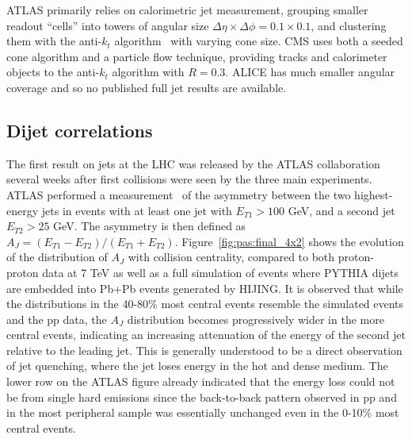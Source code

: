 ATLAS primarily relies on calorimetric jet measurement, grouping smaller readout ``cells''      
into towers of angular size $\Delta \eta \times \Delta \phi = 0.1 \times 0.1$, and 
clustering them with the anti-$k_t$ algorithm~\cite{Cacciari:2008gp} with varying cone size.
CMS uses both a seeded cone algorithm and a 
particle flow technique, providing tracks and calorimeter objects to the 
anti-$k_t$ algorithm with $R=0.3$.
ALICE has much smaller angular coverage and so no published full jet results are available.

\subsection{Dijet correlations}

The first result on jets at the LHC was released by the ATLAS collaboration 
several weeks after first collisions were seen by the three main experiments.  
ATLAS performed a measurement~\cite{Aad:2010bu} of
the asymmetry between the two highest-energy jets in events with at least one jet
with $E_{T1} > 100$ GeV, and a second jet $E_{T2} > 25$ GeV.  The asymmetry is
then defined as $A_J = (E_{T1} - E_{T2})/(E_{T1} + E_{T2})$.
Figure~\ref{fig:pas:final_4x2} shows the evolution of the distribution of
$A_J$ with collision centrality, compared to both proton-proton data at 7 TeV
as well as a full simulation of events where PYTHIA dijets are embedded into
Pb+Pb events generated by HIJING.
It is observed that while the distributions in the 40-80\% most central events
resemble the simulated events and the pp data, the $A_J$ distribution becomes
progressively wider in the more central events, indicating an increasing attenuation
of the energy of the second jet relative to the leading jet.  This is generally
understood to be a direct observation of jet quenching, where the jet loses energy
in the hot and dense medium.
The lower row on the ATLAS figure already indicated that the energy loss could not be
from single hard emissions since the back-to-back pattern observed in pp and in
the most peripheral sample was essentially unchanged even in the 0-10\% most
central events.


